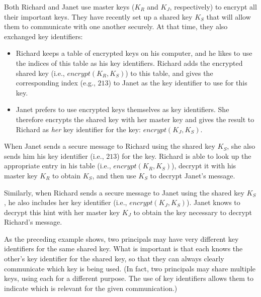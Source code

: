 \begin{example}\label{ex:key-hints}
  Both Richard and Janet use master keys ($K_R$ and $K_J$, respectively)
  to encrypt all their important keys.  They have recently set up a
  shared key $K_S$ that will allow them to communicate with one another
  securely.  At that time, they also exchanged key identifiers:
  \begin{itemize}
  \item Richard keeps a table of encrypted keys on his computer, and he
    likes to use the indices of this table as his key identifiers.  Richard
    adds the encrypted shared key (i.e., $\mathit{encrypt}(K_R,K_S)$) to
    this table, and gives the corresponding index (e.g., $213$) to Janet as
    the key identifier to use for this key.
  \item Janet prefers to use encrypted keys themselves as key identifiers.
    She therefore encrypts the shared key with her master key and gives
    the result to Richard as \emph{her} key identifier for the key:
    $\mathit{encrypt}(K_J,K_S)$.
  \end{itemize}

  When Janet sends a secure message to Richard using the shared key
  $K_S$, she also sends him his 
  key identifier (i.e., $213$) for the key.  Richard is able to look up the
  appropriate entry in his table (i.e., $\mathit{encrypt}(K_R,K_S)$),
  decrypt it with his master 
  key $K_R$ to obtain $K_S$, and then use $K_S$ to decrypt Janet's
  message.  

  Similarly, when Richard sends a secure message to Janet using the
  shared key $K_S$, he also includes her key identifier (i.e.,
  $\mathit{encrypt}(K_J,K_S)$).  Janet knows to decrypt this hint with
  her master key $K_J$ to obtain the key necessary to decrypt Richard's
  message.
\end{example}

As the preceding example shows, two principals may have very different
key identifiers for the same shared key.  What is important is that each
knows the other's key identifier for the shared key, so that they can
always clearly communicate which key is being used.  (In fact, two
principals may share multiple keys, using each for a different purpose.
The use of key identifiers allows them to indicate which is relevant for
the given communication.)

